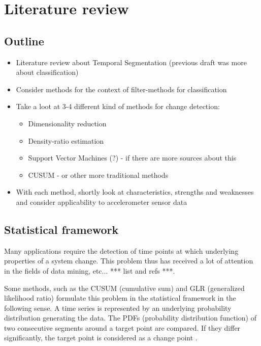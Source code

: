 
\chapter{Literature review}

\label{Chapter2} %


\section{Outline}
\begin{itemize}
  \item Literature review about Temporal Segmentation (previous draft was more about classification)
  \item Consider methods for the context of filter-methods for classification
  \item Take a loot at 3-4 different kind of methods for change detection:
    \begin{itemize}
      \item Dimensionality reduction
      \item Density-ratio estimation
      \item Support Vector Machines (?) - if there are more sources about this
      \item CUSUM - or other more traditional methods
    \end{itemize}
  \item With each method, shortly look at characteristics, strengths and weaknesses and consider applicability to accelerometer sensor data
\end{itemize}



\section{Statistical framework}
Many applications require the detection of time points at which underlying properties of a system change.
This problem thus has received a lot of attention in the fields of data mining, etc... *** list and refs ***.

Some methods, such as the CUSUM (cumulative sum) \cite{basseville1993detection} and GLR (generalized likelihood ratio) \cite{gustafsson1996marginalized, gustafsson2000adaptive} formulate this problem in the statistical framework in the following sense.
A time series is represented by an underlying probability distribution generating the data.
The PDFs (probability distribution function) of two consecutive segments around a target point are compared.
If they differ significantly, the target point is considered as a change point \cite{kawahara2009change}.

